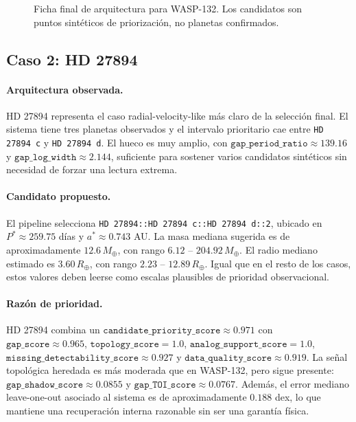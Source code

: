 \begin{figure}[H]
\centering
{}
\caption{Ficha final de arquitectura para WASP-132. Los candidatos son puntos sint\'eticos de priorizaci\'on, no planetas confirmados.}
\label{fig:final-wasp132}
\end{figure}

\subsection{Caso 2: HD 27894}

\paragraph{Arquitectura observada.}
HD 27894 representa el caso radial-velocity-like m\'as claro de la selecci\'on final. El sistema tiene tres planetas observados y el intervalo prioritario cae entre \texttt{HD 27894 c} y \texttt{HD 27894 d}. El hueco es muy amplio, con \(\texttt{gap\_period\_ratio}\approx 139.16\) y \(\texttt{gap\_log\_width}\approx 2.144\), suficiente para sostener varios candidatos sint\'eticos sin necesidad de forzar una lectura extrema.

\paragraph{Candidato propuesto.}
El pipeline selecciona \texttt{HD 27894::HD 27894 c::HD 27894 d::2}, ubicado en \(P^\ast \approx 259.75\) d\'ias y \(a^\ast \approx 0.743\) AU. La masa mediana sugerida es de aproximadamente \(12.6\,M_\oplus\), con rango \(6.12\) -- \(204.92\,M_\oplus\). El radio mediano estimado es \(3.60\,R_\oplus\), con rango \(2.23\) -- \(12.89\,R_\oplus\). Igual que en el resto de los casos, estos valores deben leerse como escalas plausibles de prioridad observacional.

\paragraph{Raz\'on de prioridad.}
HD 27894 combina un \(\texttt{candidate\_priority\_score}\approx 0.971\) con \(\texttt{gap\_score}\approx 0.965\), \(\texttt{topology\_score}=1.0\), \(\texttt{analog\_support\_score}=1.0\), \(\texttt{missing\_detectability\_score}\approx 0.927\) y \(\texttt{data\_quality\_score}\approx 0.919\). La se\~nal topol\'ogica heredada es m\'as moderada que en WASP-132, pero sigue presente: \(\texttt{gap\_shadow\_score}\approx 0.0855\) y \(\texttt{gap\_TOI\_score}\approx 0.0767\). Adem\'as, el error mediano leave-one-out asociado al sistema es de aproximadamente \(0.188\) dex, lo que mantiene una recuperaci\'on interna razonable sin ser una garant\'ia f\'isica.

